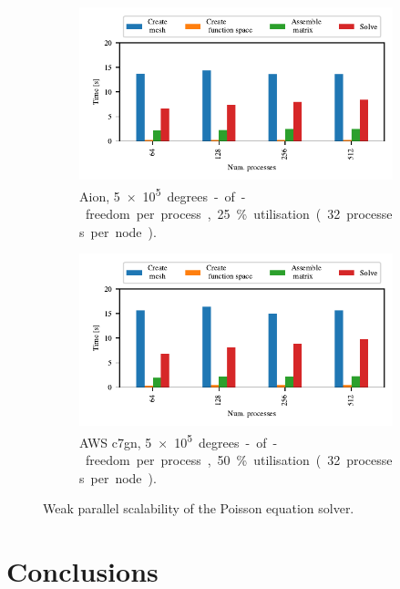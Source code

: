 \begin{figure}
    \begin{subfigure}{.7\textwidth}
        \centering
        \includegraphics{chapters/chp1/graphics/parallel_scaling_plots/output/weak_scaling_aion_poisson.pdf}
        \caption{Aion, \SI{5e+5} degrees-of-freedom per process, 25 \% utilisation (32 processes per node).}
        \label{fig:weak-scaling-aion}
    \end{subfigure}

    \begin{subfigure}{.7\textwidth}
        \centering
        \includegraphics{chapters/chp1/graphics/parallel_scaling_plots/output/weak_scaling_aws_c7gn_poisson.pdf}
        \caption{AWS c7gn, \SI{5e+5} degrees-of-freedom per process, 50 \% utilisation (32 processes per node).}
        \label{fig:weak-scaling-aws}
    \end{subfigure}
    \caption{Weak parallel scalability of the Poisson equation solver.}
    \label{fig:weak-scaling}
\end{figure}

\section*{Conclusions}


